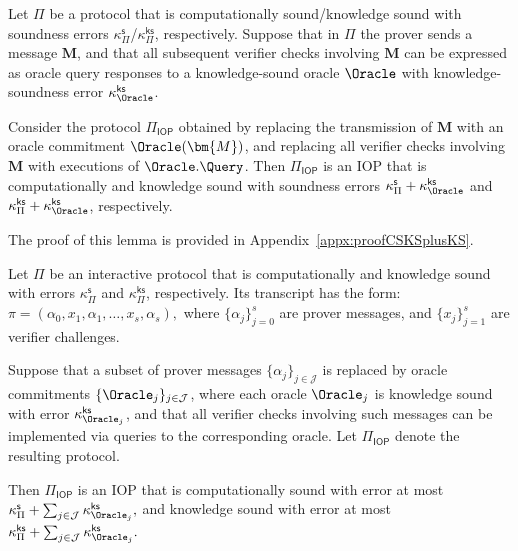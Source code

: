 \begin{lemma}[Computational/Knowledge Sound Protocol + Knowledge Sound Oracle = Computational/Knowledge Sound IOP]
\label{lemma:csksPlusKS}
Let $\Pi$ be a protocol that is computationally sound/knowledge sound with
soundness errors $\kappa_\Pi^{\mathsf{s}}$/$\kappa_\Pi^{\mathsf{ks}}$,
respectively.
Suppose that in $\Pi$ the prover sends a message $\bm{M}$, and that all subsequent
verifier checks involving $\bm{M}$ can be expressed as oracle query responses to
a knowledge-sound oracle $\Oracle$ with knowledge-soundness error
$\kappa_\Oracle^{\mathsf{ks}}$.

Consider the protocol $\Pi_{\mathsf{IOP}}$ obtained by replacing the transmission
of $\bm{M}$ with an oracle commitment $\Oracle(\bm{M})$, and replacing all
verifier checks involving $\bm{M}$ with executions of $\Oracle.\Query$.
Then $\Pi_{\mathsf{IOP}}$ is an IOP that is computationally and knowledge sound
with soundness errors
$\kappa_\Pi^{\mathsf{s}} + \kappa_\Oracle^{\mathsf{ks}}$
and
$\kappa_\Pi^{\mathsf{ks}} + \kappa_\Oracle^{\mathsf{ks}}$,
respectively.
\end{lemma}

The proof of this lemma is provided in Appendix~\ref{appx:proofCSKSplusKS}.


\begin{theorem}
\label{theorem:iop}
Let $\Pi$ be an interactive protocol that is computationally and knowledge sound
with errors $\kappa_\Pi^{\mathsf{s}}$ and $\kappa_\Pi^{\mathsf{ks}}$,
respectively.
Its transcript has the form:
\(
\pi = (\alpha_0, x_1, \alpha_1, \ldots, x_s, \alpha_s),
\)
where $\{\alpha_j\}_{j=0}^s$ are prover messages, and
$\{x_j\}_{j=1}^s$ are verifier challenges.

Suppose that a subset of prover messages
$\{\alpha_j\}_{j\in\mathcal{J}}$ is replaced by oracle commitments
$\{\Oracle_j\}_{j\in\mathcal{J}}$, where each oracle $\Oracle_j$ is knowledge sound
with error $\kappa_{\Oracle_j}^{\mathsf{ks}}$,
and that all verifier checks involving such messages can be implemented via queries to the corresponding
oracle.
Let $\Pi_{\mathsf{IOP}}$ denote the resulting protocol.

Then $\Pi_{\mathsf{IOP}}$ is an IOP that is
computationally sound with error at most
\(
\kappa_\Pi^{\mathsf{s}} + \sum_{j\in\mathcal{J}} \kappa_{\Oracle_j}^{\mathsf{ks}},
\)
and knowledge sound with error at most
\(
\kappa_\Pi^{\mathsf{ks}} + \sum_{j\in\mathcal{J}} \kappa_{\Oracle_j}^{\mathsf{ks}}.
\)
\end{theorem}

